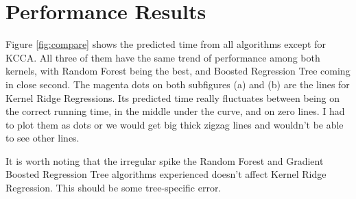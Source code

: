 \section{Performance Results} %

Figure \ref{fig:compare} shows the predicted time from all algorithms except for KCCA. All three of them have the same trend of performance among both kernels, with Random Forest being the best, and Boosted Regression Tree coming in close second. The magenta dots on both subfigures (a) and (b) are the lines for Kernel Ridge Regressions. Its predicted time really fluctuates between being on the correct running time, in the middle under the curve, and on zero lines. I had to plot them as dots or we would get big thick zigzag lines and wouldn't be able to see other lines.

It is worth noting that the irregular spike the Random Forest and Gradient Boosted Regression Tree algorithms experienced doesn't affect Kernel Ridge Regression. This should be some tree-specific error.

